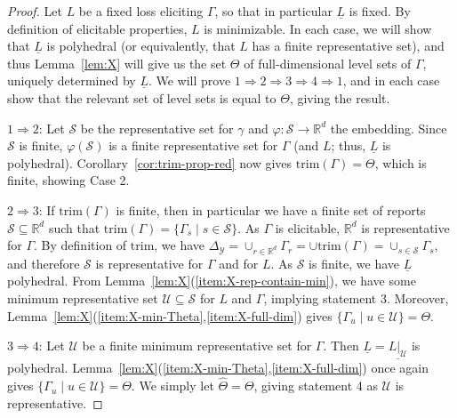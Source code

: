 \documentclass[twoside,11pt]{article}
\newcommand{\Comments}{1}
\newcommand{\mytodo}[2]{\ifnum\Comments=1%
  \todo[linecolor=#1!80!black,backgroundcolor=#1,bordercolor=#1!80!black]{#2}\fi}
\newcommand{\raft}[1]{\mytodo{green!20!white}{RF: #1}}
\newcommand{\jessiet}[1]{\mytodo{teal!20!white}{JF: #1}}
\newcommand{\reals}{\mathbb{R}}
\newcommand{\simplex}{\Delta_\Y}
\newcommand{\Sc}{\mathcal{S}}
\newcommand{\U}{\mathcal{U}}
\newcommand{\Y}{\mathcal{Y}}
\newcommand{\risk}[1]{\underline{#1}}
\newcommand{\trimred}{\mathrm{trim}}
\begin{document}
\begin{proof}
  Let $L$ be a fixed loss eliciting $\Gamma$, so that in particular $\risk L$ is fixed.
  By definition of elicitable properties, $L$ is minimizable.
  In each case, we will show that $\risk L$ is polyhedral (or equivalently, that $L$ has a finite representative set), and thus Lemma~\ref{lem:X} will give us the set $\Theta$ of full-dimensional level sets of $\Gamma$, uniquely determined by $\risk L$.
  We will prove $1 \Rightarrow 2 \Rightarrow 3 \Rightarrow 4 \Rightarrow 1$, and in each case show that the relevant set of level sets is equal to $\Theta$, giving the result.

  $1 \Rightarrow 2$:
  Let $\Sc$ be the representative set for $\gamma$ and $\varphi:\Sc\to\reals^d$ the embedding.
  Since $\Sc$ is finite, $\varphi(\Sc)$ is a finite representative set for $\Gamma$ (and $L$; thus, $\risk L$ is polyhedral).
  Corollary~\ref{cor:trim-prop-red} now gives $\trimred(\Gamma) = \Theta$, which is finite, showing Case 2.

  $2 \Rightarrow 3$:
  If $\trimred(\Gamma)$ is finite, then in particular we have a finite set of reports $\Sc \subseteq \reals^d$ such that $\trimred(\Gamma) = \{\Gamma_s \mid s\in\Sc\}$.
  As $\Gamma$ is elicitable, $\reals^d$ is representative for $\Gamma$.
  By definition of $\trimred$, we have $\simplex = \cup_{r\in\reals^d} \Gamma_r = \cup \trimred(\Gamma) = \cup_{s\in\Sc} \Gamma_s$, and therefore $\Sc$ is representative for $\Gamma$ and for $L$.
  As $\Sc$ is finite, we have $\risk L$ polyhedral.
  From Lemma~\ref{lem:X}(\ref{item:X-rep-contain-min}), we have some minimum representative set $\U\subseteq\Sc$ for $L$ and $\Gamma$, implying statement 3.
  Moreover, Lemma~\ref{lem:X}(\ref{item:X-min-Theta},\ref{item:X-full-dim}) gives $\{\Gamma_u \mid u\in\U\} = \Theta$.

  $3 \Rightarrow 4$:
  Let $\U$ be a finite minimum representative set for $\Gamma$.
  Then $\risk L = \risk{L|_\U}$ is polyhedral.
  Lemma~\ref{lem:X}(\ref{item:X-min-Theta},\ref{item:X-full-dim}) once again gives $\{\Gamma_u \mid u\in\U\} = \Theta$.
  We simply let $\hat\Theta = \Theta$, giving statement 4 as $\U$ is representative.


\end{proof}
\end{document}
